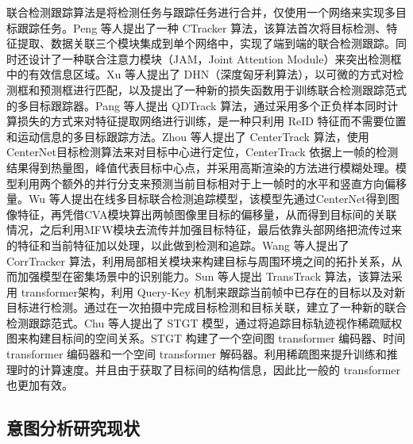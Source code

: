 联合检测跟踪算法是将检测任务与跟踪任务进行合并，仅使用一个网络来实现多目标跟踪任务。Peng 等人\cite{peng2020chained}提出了一种 CTracker 算法，该算法首次将目标检测、特征提取、数据关联三个模块集成到单个网络中，实现了端到端的联合检测跟踪。同时还设计了一种联合注意力模块（JAM，Joint Attention Module）来突出检测框中的有效信息区域。Xu 等人\cite{xu2020deep}提出了 DHN（深度匈牙利算法），以可微的方式对检测框和预测框进行匹配，以及提出了一种新的损失函数用于训练联合检测跟踪范式的多目标跟踪器。Pang 等人\cite{pang2021quasidense}提出 QDTrack 算法，通过采用多个正负样本同时计算损失的方式来对特征提取网络进行训练，是一种只利用 ReID 特征而不需要位置和运动信息的多目标跟踪方法。Zhou 等人\cite{zhou2020tracking}提出了 CenterTrack 算法，使用 CenterNet\cite{zhou2019objects}目标检测算法来对目标中心进行定位，CenterTrack 依据上一帧的检测结果得到热量图，峰值代表目标中心点，并采用高斯渲染的方法进行模糊处理。模型利用两个额外的并行分支来预测当前目标相对于上一帧时的水平和竖直方向偏移量。Wu 等人\cite{wu2021track}提出在线多目标联合检测追踪模型，该模型先通过CenterNet得到图像特征，再凭借CVA模块算出两帧图像里目标的偏移量，从而得到目标间的关联情况，之后利用MFW模块去流传并加强目标特征，最后依靠头部网络把流传过来的特征和当前特征加以处理，以此做到检测和追踪。Wang 等人\cite{wang2021multiple}提出了 CorrTracker 算法，利用局部相关模块来构建目标与周围环境之间的拓扑关系，从而加强模型在密集场景中的识别能力。Sun 等人\cite{sun2020transtrack}提出 TransTrack 算法，该算法采用 transformer\cite{vaswani2017attention}架构，利用 Query-Key 机制来跟踪当前帧中已存在的目标以及对新目标进行检测。通过在一次拍摄中完成目标检测和目标关联，建立了一种新的联合检测跟踪范式。Chu 等人\cite{chu2023transmot}提出了 STGT 模型，通过将追踪目标轨迹视作稀疏赋权图来构建目标间的空间关系。STGT 构建了一个空间图 transformer 编码器、时间 transformer 编码器和一个空间 transformer 解码器。利用稀疏图来提升训练和推理时的计算速度。并且由于获取了目标间的结构信息，因此比一般的 transformer 也更加有效。

\subsection{意图分析研究现状}

